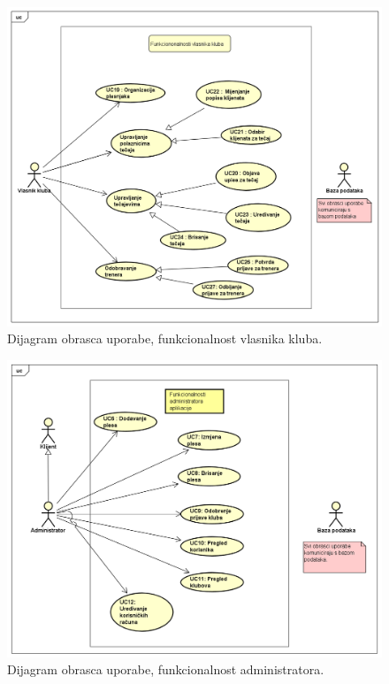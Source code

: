 				\begin{figure}[H]
			\includegraphics[scale=0.4]{slike/UC_klub.PNG} %
			\caption{Dijagram obrasca uporabe, funkcionalnost vlasnika kluba.}
			\label{fig:UC_klub} %
		\end{figure}
		
		\begin{figure}[H]
			\includegraphics[scale=0.4]{slike/UC_admin.PNG} %
			\caption{Dijagram obrasca uporabe, funkcionalnost administratora.}
			\label{fig:UC_admin} %
		\end{figure}


